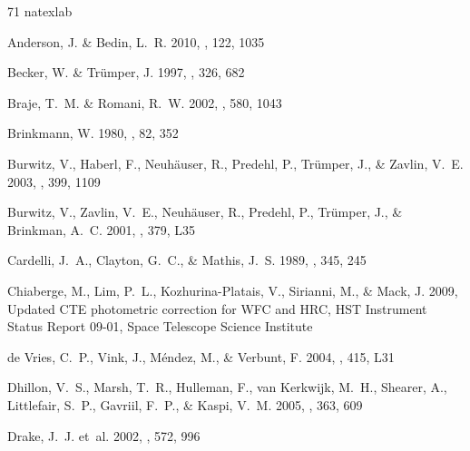 \documentclass[iop]{emulateapj}
\begin{document}
%
\begin{thebibliography}{71}
\expandafter\ifx\csname natexlab\endcsname\relax\def\natexlab#1{#1}\fi

{Anderson}, J. \& {Bedin}, L.~R. 2010, \pasp, 122, 1035

{Becker}, W. \& {Tr\"{u}mper}, J. 1997, \aap, 326, 682

{Braje}, T.~M. \& {Romani}, R.~W. 2002, \apj, 580, 1043

{Brinkmann}, W. 1980, \aap, 82, 352

{Burwitz}, V., {Haberl}, F., {Neuh{\" a}user}, R., {Predehl}, P., {Tr{\"
  u}mper}, J., \& {Zavlin}, V.~E. 2003, \aap, 399, 1109

{Burwitz}, V., {Zavlin}, V.~E., {Neuh{\" a}user}, R., {Predehl}, P., {Tr{\"
  u}mper}, J., \& {Brinkman}, A.~C. 2001, \aap, 379, L35

{Cardelli}, J.~A., {Clayton}, G.~C., \& {Mathis}, J.~S. 1989, \apj, 345, 245

{Chiaberge}, M., {Lim}, P.~L., {Kozhurina-Platais}, V., {Sirianni}, M., \&
  {Mack}, J. 2009, {Updated CTE photometric correction for WFC and HRC}, HST
  Instrument Status Report {09-01}, {Space Telescope Science Institute}

{de Vries}, C.~P., {Vink}, J., {M{\' e}ndez}, M., \& {Verbunt}, F. 2004, \aap,
  415, L31

{Dhillon}, V.~S., {Marsh}, T.~R., {Hulleman}, F., {van Kerkwijk}, M.~H.,
  {Shearer}, A., {Littlefair}, S.~P., {Gavriil}, F.~P., \& {Kaspi}, V.~M. 2005,
  \mnras, 363, 609

{Drake}, J.~J. {et~al.} 2002, \apj, 572, 996


\end{thebibliography}
\end{document}
